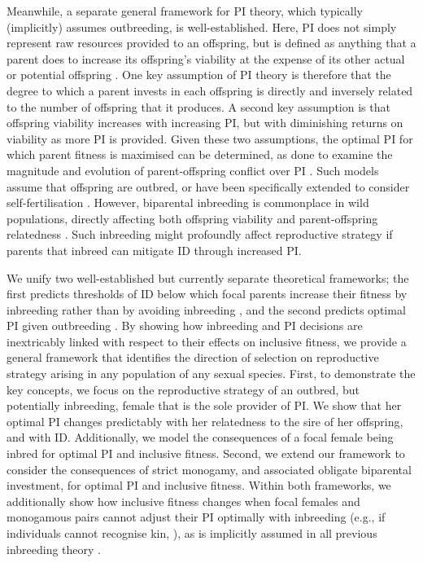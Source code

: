 \documentclass[12pt]{article}
\begin{document}
Meanwhile, a separate general framework for PI theory, which typically (implicitly) assumes outbreeding, is well-established. Here, PI does not simply represent raw resources provided to an offspring, but is defined as anything that a parent does to increase its offspring's viability at the expense of its other actual or potential offspring \cite[][]{Trivers1972, Trivers1974}. One key assumption of PI theory is therefore that the degree to which a parent invests in each offspring is directly and inversely related to the number of offspring that it produces. A second key assumption is that offspring viability increases with increasing PI, but with diminishing returns on viability as more PI is provided. Given these two assumptions, the optimal PI for which parent fitness is maximised can be determined, as done to examine the magnitude and evolution of parent-offspring conflict over PI \cite[][]{Macnair1978, Parker1978, Parker1985, DeJong2005, Kuijper2012}. Such models assume that offspring are outbred, or have been specifically extended to consider self-fertilisation \cite[][]{DeJong2005}. However, biparental inbreeding is commonplace in wild populations, directly affecting both offspring viability and parent-offspring relatedness \cite[][]{Trivers1974, Lynch1998, OGrady2006, Charlesworth2009, Reid2016}. Such inbreeding might profoundly affect reproductive strategy if parents that inbreed can mitigate ID through increased PI.

We unify two well-established but currently separate theoretical frameworks; the first predicts thresholds of ID below which focal parents increase their fitness by inbreeding rather than by avoiding inbreeding \cite[][]{Parker1979}, and the second predicts optimal PI given outbreeding \cite[][]{Macnair1978}. By showing how inbreeding and PI decisions are inextricably linked with respect to their effects on inclusive fitness, we provide a general framework that identifies the direction of selection on reproductive strategy arising in any population of any sexual species. First, to demonstrate the key concepts, we focus on the reproductive strategy of an outbred, but potentially inbreeding, female that is the sole provider of PI. We show that her optimal PI changes predictably with her relatedness to the sire of her offspring, and with ID. Additionally, we model the consequences of a focal female being inbred for optimal PI and inclusive fitness. Second, we extend our framework to consider the consequences of strict monogamy, and associated obligate biparental investment, for optimal PI and inclusive fitness. Within both frameworks, we additionally show how inclusive fitness changes when focal females and monogamous pairs cannot adjust their PI optimally with inbreeding (e.g., if individuals cannot recognise kin, \cite[][]{Penn2010}), as is implicitly assumed in all previous inbreeding theory \cite[][]{Parker1979, Parker2006, Waser1986, Kokko2006, Duthie2015a}.
\end{document}
